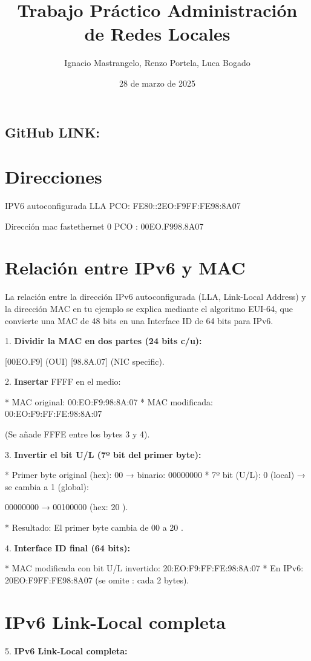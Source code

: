 \documentclass{article}
\title{Trabajo Práctico
Administración de Redes Locales}
\author{Ignacio Mastrangelo, Renzo Portela, Luca Bogado}
\date{28 de marzo de 2025}
\begin{document}
\maketitle

\subsection{GitHub LINK:} 

\section*{Direcciones}
IPV6 autoconfigurada LLA PCO: FE80::2EO:F9FF:FE98:8A07

Dirección mac fastethernet 0 PCO : 00EO.F998.8A07

\section*{Relación entre IPv6 y MAC}
La relación entre la dirección IPv6 autoconfigurada (LLA, Link-Local Address) y la dirección MAC en tu ejemplo se explica mediante el algoritmo EUI-64, que convierte una MAC de 48 bits en una Interface ID de 64 bits para IPv6.

1. \textbf{Dividir la MAC en dos partes (24 bits c/u):}

   [00EO.F9] (OUI)  
   [98.8A.07] (NIC specific).

2. \textbf{Insertar} FFFF en el medio:

   * MAC original: 00:EO:F9:98:8A:07
   * MAC modificada: 00:EO:F9:FF:FE:98:8A:07

   (Se añade  FFFE  entre los bytes 3 y 4).

3. \textbf{Invertir el bit U/L (7º bit del primer byte):}

   * Primer byte original (hex): 00 → binario: 00000000
   * 7º bit (U/L): 0 (local) → se cambia a 1 (global):

    00000000 → 00100000 (hex: 20 ).

   * Resultado: El primer byte cambia de 00 a 20 .

4. \textbf{Interface ID final (64 bits):}

   * MAC modificada con bit U/L invertido: 20:EO:F9:FF:FE:98:8A:07
   * En IPv6: 20EO:F9FF:FE98:8A07 (se omite : cada 2 bytes).

\section*{IPv6 Link-Local completa}
5. \textbf{IPv6 Link-Local completa:}
\end{document}
